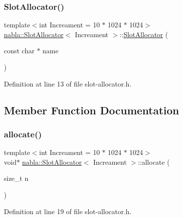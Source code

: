 \subsubsection{\texorpdfstring{SlotAllocator()}{SlotAllocator()}}
{\footnotesize\ttfamily template$<$int Increament = 10 $\ast$ 1024 $\ast$ 1024$>$ \\
\mbox{\hyperlink{classnabla_1_1_slot_allocator}{nabla\+::\+Slot\+Allocator}}$<$ Increament $>$\+::\mbox{\hyperlink{classnabla_1_1_slot_allocator}{Slot\+Allocator}} (\begin{DoxyParamCaption}\item[{const char $\ast$}]{name }\end{DoxyParamCaption})\hspace{0.3cm}{\ttfamily [inline]}}



Definition at line 13 of file slot-\/allocator.\+h.



\subsection{Member Function Documentation}
\mbox{\label{classnabla_1_1_slot_allocator_a68798c2c090a8435776be5c1fae69741}} 
\subsubsection{\texorpdfstring{allocate()}{allocate()}}
{\footnotesize\ttfamily template$<$int Increament = 10 $\ast$ 1024 $\ast$ 1024$>$ \\
void$\ast$ \mbox{\hyperlink{classnabla_1_1_slot_allocator}{nabla\+::\+Slot\+Allocator}}$<$ Increament $>$\+::allocate (\begin{DoxyParamCaption}\item[{size\+\_\+t}]{n }\end{DoxyParamCaption})\hspace{0.3cm}{\ttfamily [inline]}}



Definition at line 19 of file slot-\/allocator.\+h.

\mbox{\label{classnabla_1_1_slot_allocator_ac273b682057f051c4c226e397094b270}} 
